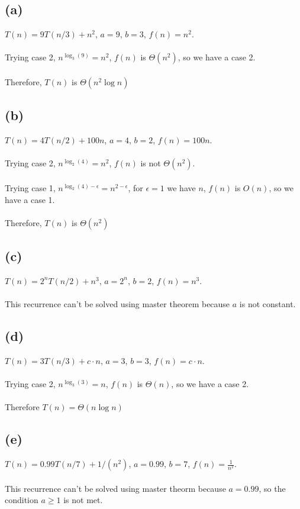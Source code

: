 \documentclass[]{article}
\begin{document}
\subsection*{(a)}
$T(n) = 9T(n/3) + n^2$, $a=9$, $b=3$, $f(n) = n^2$.
\\
\\
Trying case 2, $n^{\log_3 (9)} = n^2$, $f(n)$ is $\Theta (n^2)$, so we have a case 2.
\\
\\
Therefore, $T(n)$ is $\Theta (n^2 \log n)$
\subsection*{(b)}
$T(n) = 4T(n/2) + 100n$, $a=4$, $b=2$, $f(n) = 100n$.
\\
\\
Trying case 2, $n^{\log_2 (4)} = n^2$, $f(n)$ is not $\Theta (n^2)$.
\\
\\
Trying case 1, $n^{\log_2 (4) - \epsilon} = n^{2 -\epsilon}$, for $\epsilon = 1$ we have $n$, $f(n)$ is $O(n)$, so we have a case 1.
\\
\\
Therefore, $T(n)$ is $\Theta (n^2)$
\subsection*{(c)}
$T(n) = 2^nT(n/2) + n^3$, $a=2^n$, $b=2$, $f(n) = n^3$.
\\
\\
This recurrence can't be solved using master theorem because $a$ is not constant.
\subsection*{(d)}
$T(n) = 3T(n/3) + c \cdot n$, $a=3$, $b=3$, $f(n) = c \cdot n$.
\\
\\
Trying case 2, $n^{\log_3 (3)} = n$, $f(n)$ is $\Theta (n)$, so we have a case 2.
\\
\\
Therefore $T(n) = \Theta (n \log n)$
\subsection*{(e)}
$T(n) = 0.99T(n/7) + 1/(n^2)$, $a=0.99$, $b=7$, $f(n) = \frac{1}{n^2}$.
\\
\\
This recurrence can't be solved using master theorm because $a= 0.99$, so the condition $a \geq 1$ is not met.
\end{document}
